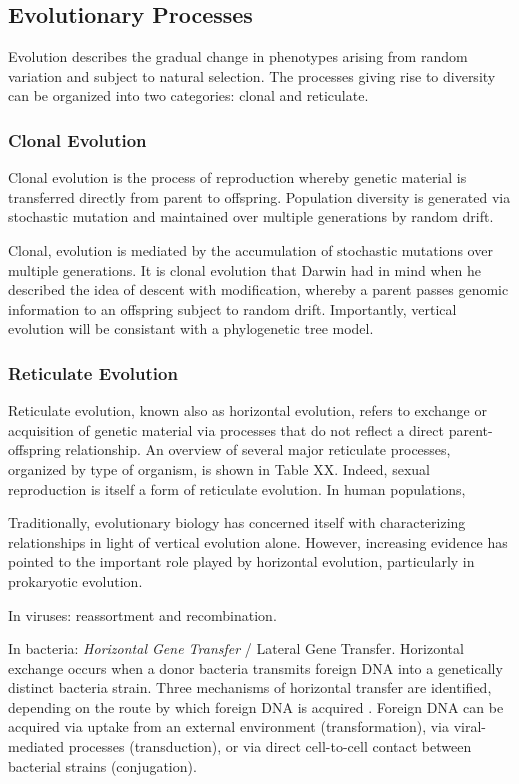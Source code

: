\subsection{Evolutionary Processes}

Evolution describes the gradual change in phenotypes arising from random variation and subject to natural selection.
The processes giving rise to diversity can be organized into two categories: clonal and reticulate.

\subsubsection{Clonal Evolution}

Clonal evolution is the process of reproduction whereby genetic material is transferred directly from parent to offspring.
Population diversity is generated via stochastic mutation and maintained over multiple generations by random drift.

Clonal, evolution is mediated by the accumulation of stochastic mutations over multiple generations.
It is clonal evolution that Darwin had in mind when he described the idea of descent with modification, whereby a parent passes genomic information to an offspring subject to random drift.
Importantly, vertical evolution will be consistant with a phylogenetic tree model.

\subsubsection{Reticulate Evolution}

Reticulate evolution, known also as horizontal evolution, refers to exchange or acquisition of genetic material via processes that do not reflect a direct parent-offspring relationship.
An overview of several major reticulate processes, organized by type of organism, is shown in Table XX.
Indeed, sexual reproduction is itself a form of reticulate evolution.
In human populations,

Traditionally, evolutionary biology has concerned itself with characterizing relationships in light of vertical evolution alone.
However, increasing evidence has pointed to the important role played by horizontal evolution, particularly in prokaryotic evolution.

In viruses: reassortment and recombination.

In bacteria: \emph{Horizontal Gene Transfer} / Lateral Gene Transfer.
Horizontal exchange occurs when a donor bacteria transmits foreign DNA into a genetically distinct bacteria strain.
Three mechanisms of horizontal transfer are identified, depending on the route by which foreign DNA is acquired \cite{Ochman:2000dr}.
Foreign DNA can be acquired via uptake from an external environment (transformation), via viral-mediated processes (transduction), or via direct cell-to-cell contact between bacterial strains (conjugation).


